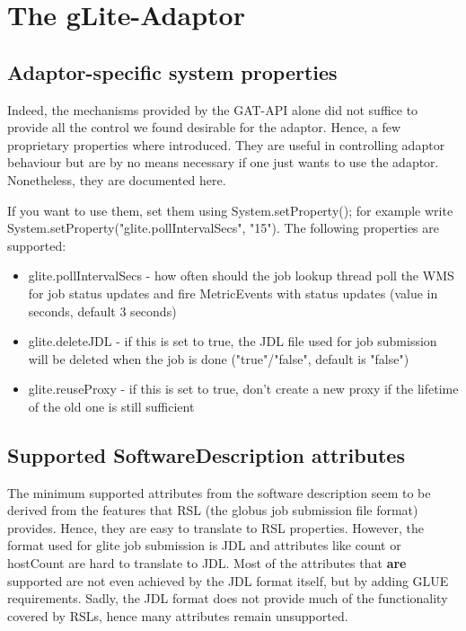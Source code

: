 \documentclass{scrreprt}
\begin{document}
\chapter{The gLite-Adaptor} 

\section{Adaptor-specific system properties}

Indeed, the mechanisms provided by the GAT-API alone did not suffice to provide all the control we found 
desirable for the adaptor. Hence, a few proprietary properties where introduced. They are useful
in controlling adaptor behaviour but are by no means necessary if one just wants to use the adaptor.
Nonetheless, they are documented here.
 
If you want to use them, set them using System.setProperty(); for example write 
System.setProperty("glite.pollIntervalSecs", "15").
The following properties are supported:

\begin{itemize}
 \item glite.pollIntervalSecs - how often should the job lookup thread poll the WMS for job status updates and fire MetricEvents with status updates (value in seconds, default 3 seconds)
 \item glite.deleteJDL - if this is set to true, the JDL file used for job submission will be deleted when the job is done ("true"/"false", default is "false")
 \item glite.reuseProxy - if this is set to true, don't create a new proxy if the lifetime of the old one is still sufficient
\end{itemize}

\section{Supported SoftwareDescription attributes}

The minimum supported attributes from the software description seem to be derived from the features
that RSL (the globus job submission file format) provides. Hence, they are easy to translate to RSL 
properties.
However, the format used for glite job submission is JDL and attributes like count or hostCount are
hard to translate to JDL. Most of the attributes that \textbf{are} supported are not even achieved by the JDL
format itself, but by adding GLUE requirements.
Sadly, the JDL format does not provide much of the functionality covered by RSLs, hence many attributes
remain unsupported.
 
\end{document}
